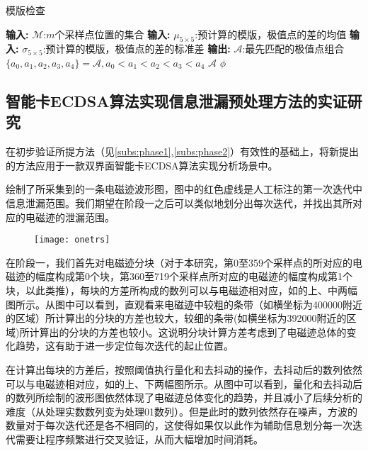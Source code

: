 {	\begin{breakablealgorithm}
		\caption{模版检查}\label{alg:checkdelta}
		\begin{algorithmic}[1]
			\Statex \textbf{输入:} $\mathcal M$:$m$个采样点位置的集合
			\Statex \textbf{输入:} $\mu_{5\times5}$:预计算的模版，极值点的差的均值
			\Statex \textbf{输入:} $\sigma_{5\times5}$:预计算的模版，极值点的差的标准差
			\Statex \textbf{输出:} $\mathcal A$:最先匹配的极值点组合
			\State $\{a_0,a_1,a_2,a_3,a_4\}=\mathcal A,a_0<a_1<a_2<a_3<a_4$
			\State \Return $\mathcal A$
			\EndIf
			\EndIf
			\EndFor
			\State \Return $\phi$
		\end{algorithmic}
	\end{breakablealgorithm}
	\subsection{智能卡ECDSA算法实现信息泄漏预处理方法的实证研究}
	
	在初步验证所提方法（见\ref{subs:phase1},\ref{subs:phase2}）有效性的基础上，将新提出的方法应用于一款双界面智能卡ECDSA算法实现分析场景中。
	
	绘制了所采集到的一条电磁迹波形图，图中的红色虚线是人工标注的第一次迭代中信息泄漏范围。我们期望在阶段一之后可以类似地划分出每次迭代，并找出其所对应的电磁迹的泄漏范围。
	
	\begin{figure}[!h]
		\begin{center}
			\texttt{[image: onetrs]}
			\label{fig:onetrs}
		\end{center}
	\end{figure}
	
	在阶段一，我们首先对电磁迹分块（对于本研究，第0至359个采样点的所对应的电磁迹的幅度构成第0个块，第360至719个采样点所对应的电磁迹的幅度构成第1个块，以此类推），每块的方差所构成的数列可以与电磁迹相对应，如的上、中两幅图所示。从图中可以看到，直观看来电磁迹中较粗的条带（如横坐标为400000附近的区域）所计算出的分块的方差也较大，较细的条带(如横坐标为392000附近的区域)所计算出的分块的方差也较小。这说明分块计算方差考虑到了电磁迹总体的变化趋势，这有助于进一步定位每次迭代的起止位置。
	
	在计算出每块的方差后，按照阈值执行量化和去抖动的操作，去抖动后的数列依然可以与电磁迹相对应，如的上、下两幅图所示。从图中可以看到，量化和去抖动后的数列所绘制的波形图依然体现了电磁迹总体变化的趋势，并且减小了后续分析的难度（从处理实数数列变为处理01数列）。但是此时的数列依然存在噪声，方波的数量对于每次迭代还是各不相同的，这使得如果仅以此作为辅助信息划分每一次迭代需要让程序频繁进行交叉验证，从而大幅增加时间消耗。
	
}

